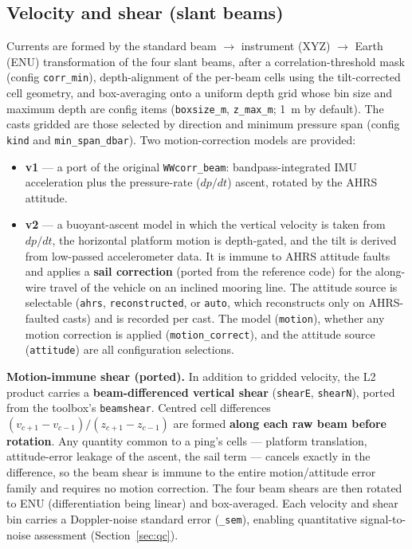 \documentclass[11pt]{article}
\newcommand{\code}[1]{\texttt{#1}}
\begin{document}
\subsection{Velocity and shear (slant beams)}

Currents are formed by the standard beam $\to$ instrument (XYZ) $\to$ Earth (ENU)
transformation of the four slant beams, after a correlation-threshold mask (config
\code{corr\_min}), depth-alignment of the per-beam cells using the tilt-corrected cell
geometry, and box-averaging onto a uniform depth grid whose bin size and maximum depth are
config items (\code{boxsize\_m}, \code{z\_max\_m}; 1~m by default). The casts gridded are those
selected by direction and minimum pressure span (config \code{kind} and \code{min\_span\_dbar}).
Two motion-correction models are provided:

\begin{itemize}
\item \textbf{v1} --- a port of the original \code{WWcorr\_beam}: bandpass-integrated IMU
acceleration plus the pressure-rate ($dp/dt$) ascent, rotated by the AHRS attitude.
\item \textbf{v2} --- a buoyant-ascent model in which the vertical velocity is taken from
$dp/dt$, the horizontal platform motion is depth-gated, and the tilt is derived from
low-passed accelerometer data. It is immune to AHRS attitude faults and applies a
\textbf{sail correction} (ported from the reference code) for the along-wire travel of the
vehicle on an inclined mooring line.
The attitude source is selectable (\code{ahrs}, \code{reconstructed}, or \code{auto}, which
reconstructs only on AHRS-faulted casts) and is recorded per cast. The model (\code{motion}),
whether any motion correction is applied (\code{motion\_correct}), and the attitude source
(\code{attitude}) are all configuration selections.
\end{itemize}

\textbf{Motion-immune shear (ported).} In addition to gridded velocity, the L2 product
carries a \textbf{beam-differenced vertical shear} (\code{shearE}, \code{shearN}), ported from
the toolbox's \code{beamshear}. Centred cell differences
$(v_{c+1}-v_{c-1})/(z_{c+1}-z_{c-1})$ are formed \textbf{along each raw beam before rotation}.
Any quantity common to a ping's cells --- platform translation, attitude-error leakage of the
ascent, the sail term --- cancels exactly in the difference, so the beam shear is immune to
the entire motion/attitude error family and requires no motion correction. The four beam
shears are then rotated to ENU (differentiation being linear) and box-averaged. Each velocity
and shear bin carries a Doppler-noise standard error (\code{\_sem}), enabling quantitative
signal-to-noise assessment (Section~\ref{sec:qc}).
\end{document}
